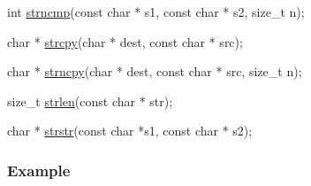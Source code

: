 \begin{DoxyCode}
\textcolor{keywordtype}{int} \mbox{\hyperlink{a00038_a07f4a84c11c106e95c32b6ab509346ef}{strncmp}}(\textcolor{keyword}{const} \textcolor{keywordtype}{char} * s1, \textcolor{keyword}{const} \textcolor{keywordtype}{char} * s2, \textcolor{keywordtype}{size\_t} n);

\textcolor{keywordtype}{char} * \mbox{\hyperlink{a00038_a7a82515b5d377be04817715c5465b647}{strcpy}}(\textcolor{keywordtype}{char} * dest, \textcolor{keyword}{const} \textcolor{keywordtype}{char} * src);

\textcolor{keywordtype}{char} * \mbox{\hyperlink{a00038_a47d54f24198df56da51078a6c540b9ed}{strncpy}}(\textcolor{keywordtype}{char} * dest, \textcolor{keyword}{const} \textcolor{keywordtype}{char} * src, \textcolor{keywordtype}{size\_t} n);

\textcolor{keywordtype}{size\_t} \mbox{\hyperlink{a00038_a008e171a518fe0e0352f31b245e03875}{strlen}}(\textcolor{keyword}{const} \textcolor{keywordtype}{char} * str);

\textcolor{keywordtype}{char} * \mbox{\hyperlink{a00038_aeb923ee2a7a01f82eb1e2f8ae188c6d4}{strstr}}(\textcolor{keyword}{const} \textcolor{keywordtype}{char} *s1, \textcolor{keyword}{const} \textcolor{keywordtype}{char} * s2);
\end{DoxyCode}


\subsubsection*{Example}


 